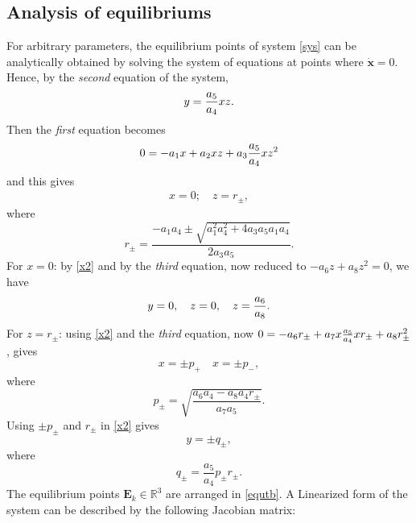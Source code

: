 \documentclass[final,5p,times,twocolumn]{elsarticle}
\begin{document}
\subsection{Analysis of equilibriums}
For arbitrary parameters, the equilibrium points of system \eqref{sys} can be analytically obtained by solving the system of equations at points where $\bm{\dot{x}}=0$. Hence, by the \textit{second} equation of the system,
\begin{equation}
\begin{split}
y = {a_5\over a_4}xz\label{x2}.
\end{split}
\end{equation}
Then the \textit{first} equation becomes
\begin{equation}
\begin{split}
0 = -a_1x+a_2xz+a_3{a_5\over a_4}xz^2
\end{split}
\end{equation}
and this gives
\begin{equation}
\begin{split}
x = 0;\quad z = r_{\pm},
\end{split}
\end{equation}
where
\begin{equation}
r_{\pm}=\frac{-a_1a_4\pm\sqrt{a_1^2a_4^2+4a_3a_5a_1a_4}}{2a_3a_5}.
\end{equation}
For $x=0$: by \eqref{x2} and by the \textit{third} equation, now reduced to $-a_6z+a_8z^2=0$, we have 
\begin{equation}
y=0,\quad z=0,\quad z = {a_6\over a_8}.	
\end{equation}		
For $z = r_{\pm}$: using \eqref{x2} and the \textit{third} equation, now $0=-a_6r_{\pm}+a_7x{a_5\over a_4}xr_{\pm}+a_8r_{\pm}^2$, gives
\begin{equation}
x = \pm p_{+}\quad x = \pm p_{-},
\end{equation}		
where
\begin{equation}			
p_{\pm}= \sqrt{\frac{a_6a_4-a_8a_4r_{\pm}}{a_7a_5}}.
\end{equation}	
Using $\pm p_{\pm}$ and $r_{\pm}$ in \eqref{x2} gives 
\begin{equation}
y = \pm q_{\pm}, 	
\end{equation}
where
\begin{equation}
q_{\pm}=\frac{a_5}{a_4}p_{\pm}r_{\pm}. 		
\end{equation}		
The equilibrium points $\bm{E}_k\in\mathbb{R}^3$ are arranged in \cref{equtb}. A Linearized form of the system can be described by the following Jacobian matrix:
\end{document}
